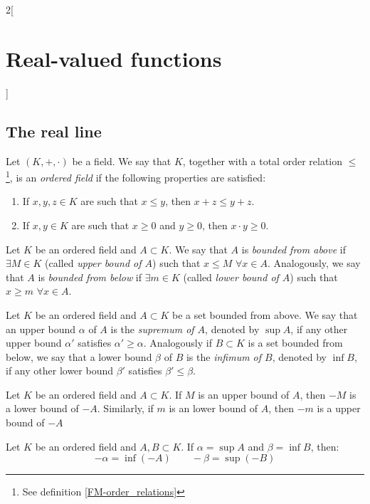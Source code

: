 \documentclass[../../../main.tex]{subfiles}
\begin{document}
\begin{multicols}{2}[\section{Real-valued functions}]
\subsection{The real line}
\begin{definition}
    Let $(K,+,\cdot)$ be a field. We say that $K$, together with a total order relation $\leq$\footnote{See definition \ref{FM-order_relations}}, is an \textit{ordered field} if the following properties are satisfied:
    \begin{enumerate}
        \item If $x,y,z\in K$ are such that $x\leq y$, then $x+z\leq y+z$.
        \item If $x,y\in K$ are such that $x\geq0$ and $y\geq0$, then $x\cdot y\geq 0$.
    \end{enumerate}
\end{definition}
\begin{definition}
    Let $K$ be an ordered field and $A\subset K$. We say that $A$ is \textit{bounded from above} if $\exists M\in K$ (called \textit{upper bound of $A$}) such that $x\leq M$ $\forall x\in A$. Analogously, we say that $A$ is \textit{bounded from below} if $\exists m\in K$ (called \textit{lower bound of $A$}) such that $x\geq m$ $\forall x\in A$.
\end{definition}
\begin{definition}
    Let $K$ be an ordered field and $A\subset K$ be a set bounded from above. We say that an upper bound $\alpha$ of $A$ is the \textit{supremum of $A$}, denoted by $\sup A$, if any other upper bound $\alpha'$ satisfies $\alpha'\geq\alpha$.
    Analogously if $B\subset K$ is a set bounded from below, we say that a lower bound $\beta$ of $B$ is the \textit{infimum of $B$}, denoted by $\inf B$, if any other lower bound $\beta'$ satisfies $\beta'\leq\beta$.
\end{definition}
\begin{prop}
    Let $K$ be an ordered field and $A\subset K$. If $M$ is an upper bound of $A$, then $-M$ is a lower bound of $-A$. Similarly, if $m$ is an lower bound of $A$, then $-m$ is a upper bound of $-A$
\end{prop}
\begin{prop}
    Let $K$ be an ordered field and $A,B\subset K$. If $\alpha=\sup A$ and $\beta=\inf B$, then: $$-\alpha=\inf(-A)\qquad-\beta=\sup(-B)$$

\end{prop}
\end{multicols}
\end{document}
